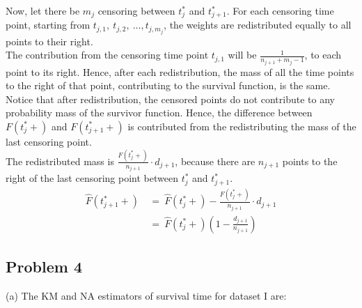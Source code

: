 \documentclass[11pt]{extarticle} %
\begin{document}
\noindent
Now, let there be $m_j$ censoring between $t^*_j$ and $t^*_{j+1}$. For each censoring time point, starting from $t_{j,1},\ t_{j,2},\ \dots, t_{j,m_j}$, the weights are redistributed equally to all points to their right. \\

\noindent
The contribution from the censoring time point $t_{j,1}$ will be $\frac{1}{n_{j+1} + m_j - 1}$, to each point to its right. Hence, after each redistribution, the mass of all the time points to the right of that point, contributing to the survival function, is the same. \\

\noindent
Notice that after redistribution, the censored points do not contribute to any probability mass of the survivor function. Hence, the difference between $F(t^*_j +)$ and $F(t^*_{j+1} +)$ is contributed from the redistributing the mass of the last censoring point. \\

\noindent
The redistributed mass is $\frac{F(t^*_{j} +)}{n_{j+1}}\cdot d_{j+1}$, because there are $n_{j+1}$ points to the right of the last censoring point between $t^*_j$ and $t^*_{j+1}$.
\begin{align*}
\hat{F}(t^*_{j+1}+)\ &{=}\ \hat{F}(t^*_{j}+) - \frac{F(t^*_{j} +)}{n_{j+1}}\cdot d_{j+1}  \\
\ &{=}\ \hat{F}(t^*_{j}+)\left(1 - \frac{d_{j+1}}{n_{j+1}}\right)
\end{align*}

\subsection*{Problem 4}
\noindent
(a) The KM and NA estimators of survival time for dataset I are:
\end{document}
